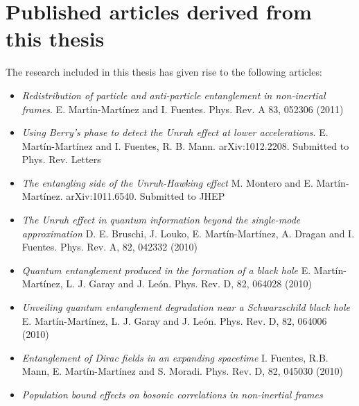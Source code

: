 
{\renewcommand{\thechapter}{}\renewcommand{\chaptername}{}
\addtocounter{chapter}{0}
\section*{Published articles derived from this thesis}}

The research included in this thesis has given rise to the following articles:
\vspace{0.5cm}
\begin{itemize}
 \item  \emph{Redistribution of particle and anti-particle entanglement in non-inertial frames}.
    E. Mart\'in-Mart\'inez and I. Fuentes. Phys. Rev. A 83, 052306 (2011)
    \vspace{0.3cm} 
\item   \emph{Using Berry's phase to detect the Unruh effect at lower accelerations}.
    E. Mart\'in-Mart\'inez and I. Fuentes, R. B. Mann. arXiv:1012.2208. Submitted to Phys. Rev. Letters
    \vspace{0.3cm}
\item   \emph{The entangling side of the Unruh-Hawking effect}
    M. Montero and E. Mart\'in-Mart\'inez. arXiv:1011.6540. Submitted to JHEP
\vspace{0.3cm}
\item   \emph{The Unruh effect in quantum information beyond the single-mode approximation}
    D. E. Bruschi, J. Louko, E. Mart\'in-Mart\'inez, A. Dragan and I. Fuentes. Phys. Rev. A, 82, 042332 (2010)
\vspace{0.3cm}
\item   \emph{Quantum entanglement produced in the formation of a black hole}
    E. Mart\'in-Mart\'inez, L. J. Garay and J. Le\'on. Phys. Rev. D, 82, 064028 (2010)
\vspace{0.3cm}
\item   \emph{Unveiling quantum entanglement degradation near a Schwarzschild black hole}
    E. Mart\'in-Mart\'inez, L. J. Garay and J. Le\'on. Phys. Rev. D, 82, 064006 (2010)
\vspace{0.3cm}
\item   \emph{Entanglement of Dirac fields in an expanding spacetime}
    I. Fuentes, R.B. Mann, E. Mart\'in-Mart\'inez and S. Moradi. Phys. Rev. D, 82, 045030 (2010)
\vspace{0.3cm}
\item   \emph{Population bound effects on bosonic correlations in non-inertial frames}

\end{itemize}
